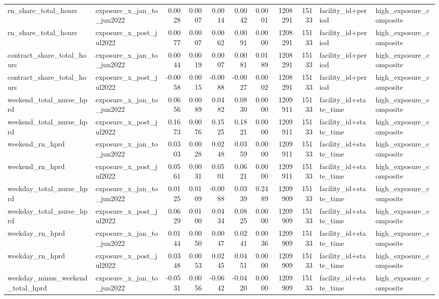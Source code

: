 \begin{tabular}{llrrrrrrrll}
rn_share_total_hours & exposure_x_jan_to_jun2022 & 0.0028 & 0.0007 & 0.0014 & 0.0042 & 0.0001 & 1208291 & 15133 & facility_id+period & high_exposure_composite \\
rn_share_total_hours & exposure_x_post_jul2022 & 0.0077 & 0.0007 & 0.0062 & 0.0091 & 0.0000 & 1208291 & 15133 & facility_id+period & high_exposure_composite \\
contract_share_total_hours & exposure_x_jan_to_jun2022 & 0.0044 & 0.0019 & 0.0007 & 0.0081 & 0.0189 & 1208291 & 15133 & facility_id+period & high_exposure_composite \\
contract_share_total_hours & exposure_x_post_jul2022 & -0.0058 & 0.0015 & -0.0088 & -0.0027 & 0.0002 & 1208291 & 15133 & facility_id+period & high_exposure_composite \\
weekend_total_nurse_hprd & exposure_x_jan_to_jun2022 & 0.0656 & 0.0089 & 0.0482 & 0.0830 & 0.0000 & 1209911 & 15133 & facility_id+state_time & high_exposure_composite \\
weekend_total_nurse_hprd & exposure_x_post_jul2022 & 0.1673 & 0.0076 & 0.1525 & 0.1821 & 0.0000 & 1209911 & 15133 & facility_id+state_time & high_exposure_composite \\
weekend_rn_hprd & exposure_x_jan_to_jun2022 & 0.0303 & 0.0028 & 0.0248 & 0.0359 & 0.0000 & 1209911 & 15133 & facility_id+state_time & high_exposure_composite \\
weekend_rn_hprd & exposure_x_post_jul2022 & 0.0561 & 0.0031 & 0.0501 & 0.0621 & 0.0000 & 1209911 & 15133 & facility_id+state_time & high_exposure_composite \\
weekday_total_nurse_hprd & exposure_x_jan_to_jun2022 & 0.0125 & 0.0109 & -0.0088 & 0.0339 & 0.2489 & 1209909 & 15133 & facility_id+state_time & high_exposure_composite \\
weekday_total_nurse_hprd & exposure_x_post_jul2022 & 0.0629 & 0.0100 & 0.0434 & 0.0825 & 0.0000 & 1209909 & 15133 & facility_id+state_time & high_exposure_composite \\
weekday_rn_hprd & exposure_x_jan_to_jun2022 & 0.0144 & 0.0050 & 0.0047 & 0.0241 & 0.0036 & 1209909 & 15133 & facility_id+state_time & high_exposure_composite \\
weekday_rn_hprd & exposure_x_post_jul2022 & 0.0348 & 0.0053 & 0.0245 & 0.0451 & 0.0000 & 1209909 & 15133 & facility_id+state_time & high_exposure_composite \\
weekday_minus_weekend_total_hprd & exposure_x_jan_to_jun2022 & -0.0531 & 0.0056 & -0.0642 & -0.0420 & 0.0000 & 1209909 & 15133 & facility_id+state_time & high_exposure_composite \\

\end{tabular}
